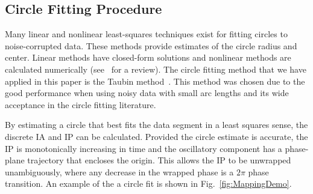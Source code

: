 \documentclass[a4paper]{IEEEtran}
\begin{document}
\subsection{Circle Fitting Procedure}\label{sect:CircleFittingProcedure}

Many linear and nonlinear least-squares techniques exist for fitting circles to noise-corrupted data. These methods provide estimates of the circle radius and center. Linear methods have closed-form solutions and nonlinear methods are calculated numerically (see~\cite{Chernov2005} for a review). The circle fitting method that we have applied in this paper is the Taubin method~\cite{Taubin1991}. This method was chosen due to the good performance when using noisy data with small arc lengths and its wide acceptance in the circle fitting literature.

By estimating a circle that best fits the data segment in a least squares sense, the discrete IA and IP can be calculated. Provided the circle estimate is accurate, the IP is monotonically increasing in time and the oscillatory component has a phase-plane trajectory that encloses the origin. This allows the IP to be unwrapped unambiguously, where any decrease in the wrapped phase is a $2\pi$ phase transition. An example of the a circle fit is shown in Fig.~\ref{fig:MappingDemo}.
\end{document}
